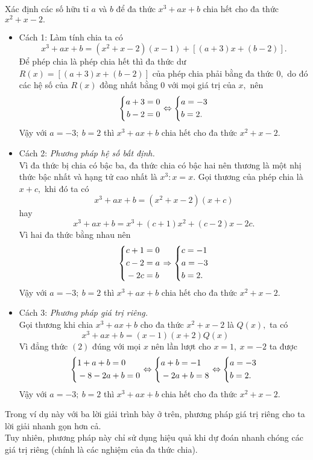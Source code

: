 \begin{vd} %
Xác định các số hữu tỉ $a$ và $b$ để đa thức $x^3+ax+b$ chia hết cho đa thức $x^2+x-2.$
	\loigiai
	{
		\begin{itemize}
			\item Cách 1: Làm tính chia ta có 
			 \[x^3+ax+b=(x^2+x-2)(x-1)+[(a+3)x+(b-2)].\]
			 Để phép chia là phép chia hết thì đa thức dư $R(x)=[(a+3)x+(b-2)]$ của phép chia phải bằng đa thức $0,$ do đó các hệ số của $R(x)$ đồng nhất bằng $0$ với mọi giá trị của $x,$ nên
			 \[\left\{\begin{aligned}a+3=0\\b-2=0\end{aligned}\right.\Leftrightarrow\left\{\begin{aligned}&a=-3\\&b=2.\end{aligned}\right.\]
			 Vậy với $a=-3;\ b=2$ thì $x^3+ax+b$ chia hết cho đa thức $x^2+x-2.$
			\item  Cách 2: {\it Phương pháp hệ số bất định.} \\
			Vì đa thức bị chia có bậc ba, đa thức chia có bậc hai nên thương là một nhị thức bậc nhất và hạng tử cao nhất là $x^3:x=x.$ Gọi thương của phép chia là $x+c,$ khi đó ta có 
			\[x^3+ax+b=(x^2+x-2)(x+c)\] hay 
			\[x^3+ax+b=x^3+(c+1)x^2+(c-2)x-2c.\]
			Vì hai đa thức bằng nhau nên 
			\[\left\{\begin{aligned}&c+1=0\\&c-2=a\\&-2c=b\end{aligned}\right.\Rightarrow\left\{\begin{aligned}&c=-1\\&a=-3\\&b=2.\end{aligned}\right.\]
			Vậy với $a=-3;\ b=2$ thì $x^3+ax+b$ chia hết cho đa thức $x^2+x-2.$
			\item Cách 3: {\it Phương pháp giá trị riêng.}\\
			Gọi thương khi chia $x^3+ax+b$ cho đa thức $x^2+x-2$ là $Q(x),$ ta có \[x^3+ax+b=(x-1)(x+2)Q(x)\qquad\tag{2}\] 
			Vì đẳng thức $(2)$ đúng với mọi $x$ nên lần lượt cho $x=1,\ x=-2$ ta được 
			\[\left\{\begin{aligned}&1+a+b=0\\&-8-2a+b=0\end{aligned}\right.\Leftrightarrow\left\{\begin{aligned}&a+b=-1\\&-2a+b=8\end{aligned}\right.\Leftrightarrow\left\{\begin{aligned}&a=-3\\&b=2.\end{aligned}\right.\]
			Vậy với $a=-3;\ b=2$ thì $x^3+ax+b$ chia hết cho đa thức $x^2+x-2.$
	\end{itemize}}
\begin{note} Trong ví dụ này với ba lời giải trình bày ở trên, phương pháp giá trị riêng cho ta lời giải nhanh gọn hơn cả.\\
	Tuy nhiên, phương pháp này chỉ sử dụng hiệu quả khi dự đoán nhanh chóng các giá trị riêng (chính là các nghiệm của đa thức chia).
	\end{note}
\end{vd}
